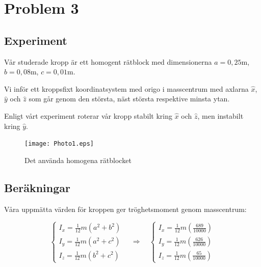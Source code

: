 \documentclass[12pt,a4paper]{article}
\begin{document}
	
\section{Problem 3}
	
	
	\subsection{Experiment}
		
		Vår studerade kropp är ett homogent rätblock med dimensionerna
		$a = 0,25 \mathrm{m}$, $b = 0,08 \mathrm{m}$, $c = 0,01 \mathrm{m}$.
		
		Vi inför ett kroppsfixt koordinatsystem med origo i masscentrum med axlarna
		$\hat{x}$, $\hat{y}$ och $\hat{z}$ som går genom den största, näst
		största respektive minsta ytan.
		
		Enligt vårt experiment roterar vår kropp stabilt kring $\hat{x}$ och $\hat{z}$, men
		instabilt kring $\hat{y}$.
		
		\begin{figure}
			\begin{center}
				\texttt{[image: Photo1.eps]}
				\caption{Det använda homogena rätblocket}
			\end{center}
		\end{figure}
		
	\subsection{Beräkningar}
		
		Våra uppmätta värden för kroppen ger tröghetsmoment genom masscentrum:
		
		\begin{equation*}
			\begin{cases}
				I_x = \frac{1}{12} m (a^2 + b^2) \\
				I_y = \frac{1}{12} m (a^2 + c^2) \\
				I_z = \frac{1}{12} m (b^2 + c^2) 
			\end{cases}
			\hspace{12pt}
			\Rightarrow
			\hspace{12pt}
			\begin{cases}
				I_x = \frac{1}{12} m (\frac{689}{10000}) \\
				I_y = \frac{1}{12} m (\frac{626}{10000}) \\
				I_z = \frac{1}{12} m (\frac{65}{10000})
			\end{cases}
		\end{equation*}
		
\end{document}
